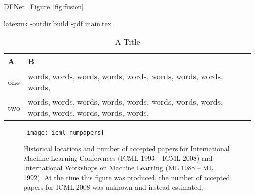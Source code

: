 \usepackage[american]{babel}
\usepackage{microtype}
\graphicspath{{figure/}}

DFNet~\cite{hong2019dfnet}
Figure~\ref{fig:fusion}

\usepackage{amsfonts}

\usepackage{balance}
\balance

latexmk -outdir build -pdf main.tex



\begin{table}[t]
    \vskip 0.2in
    \caption{A Title}
    \label{tab:tabularx}
    \begin{center}
        \begin{small}
            \begin{tabularx}{\linewidth}{lX}
                \toprule
                A & B\\
                \midrule
                one & words, words, words, words, words, words, words, words, words,  \\
                two & words, words, words, words, words, words, words, words, words, words, words, words, words, \\
                \bottomrule
            \end{tabularx}
        \end{small}
    \end{center}
    \vskip -0.2in
\end{table}

\begin{figure}[ht]
    \vskip 0.2in
    \begin{center}
        \centerline{\texttt{[image: icml\_numpapers]}}
        \caption{Historical locations and number of accepted papers for International
        Machine Learning Conferences (ICML 1993 -- ICML 2008) and International
        Workshops on Machine Learning (ML 1988 -- ML 1992). At the time this figure was
        produced, the number of accepted papers for ICML 2008 was unknown and instead
        estimated.}
        \label{icml-historical}
    \end{center}
    \vskip -0.2in
\end{figure}

